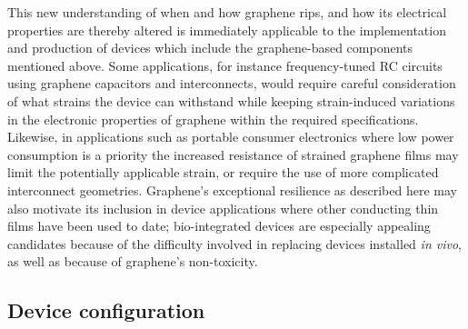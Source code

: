 \documentclass[edeposit,fullpage,draftthesis]{uiucthesis2009}
\begin{document}
        This new understanding of when and how graphene rips, and how its electrical
        properties are thereby altered is immediately applicable to the implementation
        and production of devices which include the graphene-based components mentioned
        above. Some applications, for instance frequency-tuned RC circuits using
        graphene capacitors and interconnects, would require careful consideration of
        what strains the device can withstand while keeping strain-induced variations
        in the electronic properties of graphene within the required specifications.
        Likewise, in applications such as portable consumer electronics where low power
        consumption is a priority the increased resistance of strained graphene films
        may limit the potentially applicable strain, or require the use of more
        complicated interconnect geometries\cite{Kim2011}. Graphene's exceptional
        resilience as described here may also motivate its inclusion in device
        applications where other conducting thin films have been used to date;
        bio-integrated devices\cite{Viventi2010} are especially appealing candidates
        because of the difficulty involved in replacing devices installed \textit{in
        vivo}, as well as because of graphene's non-toxicity.
       
    \subsection{Device configuration}
    
\end{document}

